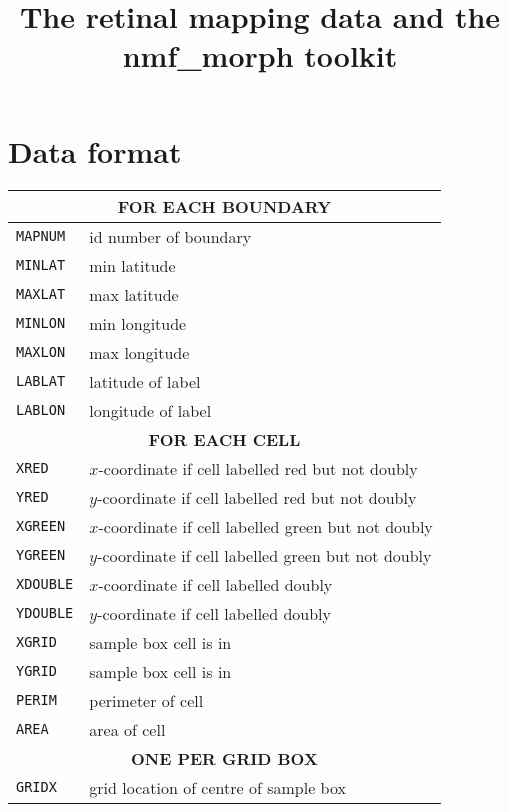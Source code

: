 \documentclass{article}
\title{The retinal mapping data and the nmf\_morph toolkit}
\begin{document}
\maketitle
\thispagestyle{myheadings}

\section{Data format}
\label{manual:sec:reading-data}

\begin{table}
  \begin{tabular}{ll}
    \hline
    \multicolumn{2}{c}{\textbf{FOR EACH BOUNDARY}} \\
    \hline
    \texttt{MAPNUM}   & id number of boundary \\  
    \texttt{MINLAT}   & min latitude      \\
    \texttt{MAXLAT}   & max latitude      \\
    \texttt{MINLON}   & min longitude     \\
    \texttt{MAXLON}   & max longitude     \\
    \texttt{LABLAT}   & latitude of label \\
    \texttt{LABLON}   & longitude of label\\
    \hline
    \multicolumn{2}{c}{\textbf{FOR EACH CELL}} \\
    \hline
    \texttt{XRED}     & $x$-coordinate if cell labelled red but not doubly\\
    \texttt{YRED}     & $y$-coordinate if cell labelled red but not doubly\\
    \texttt{XGREEN}   & $x$-coordinate if cell labelled green but not doubly\\
    \texttt{YGREEN}   & $y$-coordinate if cell labelled green but not doubly\\
    \texttt{XDOUBLE}  & $x$-coordinate if cell labelled doubly\\ 
    \texttt{YDOUBLE}  & $y$-coordinate if cell labelled doubly\\
    \texttt{XGRID}    & sample box cell is in \\
    \texttt{YGRID}    & sample box cell is in \\
    \texttt{PERIM}    & perimeter of cell \\
    \texttt{AREA}     & area of cell \\
    \hline
    \multicolumn{2}{c}{\textbf{ONE PER GRID BOX}} \\
    \hline
    \texttt{GRIDX}    & grid location of centre of sample box \\

\end{tabular}
\end{table}
\end{document}
